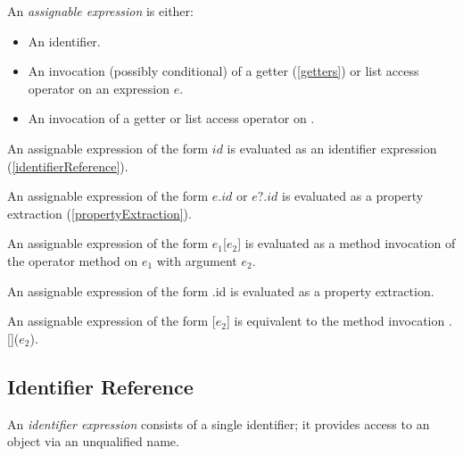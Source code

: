\documentclass{article}
\newcommand{\code}[1]{{\sf #1}}
\begin{document}
\LMHash{}
An {\em assignable expression} is either:
\begin{itemize}
 \item An identifier. 
\item An invocation (possibly conditional) of a getter (\ref{getters}) or list access operator on an expression $e$.
\item An invocation of a getter or list access operator on  \SUPER{}.
\end{itemize}


\LMHash{}
An assignable expression of the form $id$ is evaluated as an identifier expression (\ref{identifierReference}).


\LMHash{}
An assignable expression of the form $e.id$ or $e?.id$ is evaluated as a property extraction  (\ref{propertyExtraction}).

\LMHash{}
An assignable expression of the form \code{$e_1$[$e_2$]} is evaluated as a method invocation of the operator method \code{[]} on $e_1$ with argument $e_2$.

\LMHash{}
An assignable expression of the form \code{\SUPER{}.id}  is evaluated as a property extraction.

\LMHash{}
An assignable expression of the form \code{\SUPER{}[$e_2$]} is equivalent to the method invocation  \code{\SUPER{}.[]($e_2$)}.

\subsection{ Identifier Reference}

\LMHash{}
An {\em identifier expression} consists of a single identifier; it provides access to an object via an unqualified name.
\end{document}
